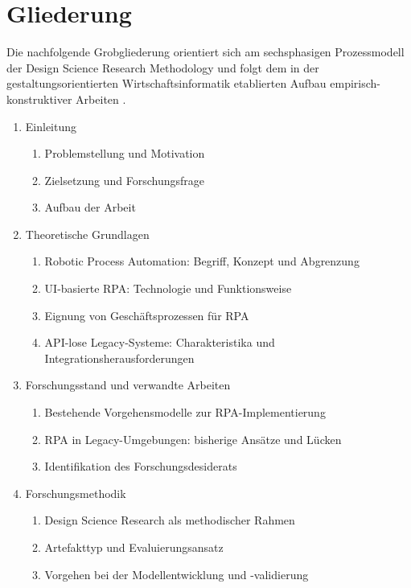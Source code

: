 \newpage
\section{Gliederung}

Die nachfolgende Grobgliederung orientiert sich am sechsphasigen Prozessmodell der Design Science Research Methodology \autocite[Vgl.][S.~45]{Peffers2007} und folgt dem in der gestaltungsorientierten Wirtschaftsinformatik etablierten Aufbau empirisch-konstruktiver Arbeiten \autocite[Vgl.][S.~75]{Hevner2004}.

{\renewcommand{\labelenumii}{\theenumi.\arabic{enumii}}
\begin{enumerate}
  \item Einleitung
    \begin{enumerate}
      \item Problemstellung und Motivation
      \item Zielsetzung und Forschungsfrage
      \item Aufbau der Arbeit
    \end{enumerate}

  \item Theoretische Grundlagen
    \begin{enumerate}
      \item Robotic Process Automation: Begriff, Konzept und Abgrenzung
      \item \acs{UI}-basierte \ac{RPA}: Technologie und Funktionsweise
      \item Eignung von Geschäftsprozessen für \ac{RPA}
      \item \acs{API}-lose Legacy-Systeme: Charakteristika und Integrationsherausforderungen
    \end{enumerate}

  \item Forschungsstand und verwandte Arbeiten
    \begin{enumerate}
      \item Bestehende Vorgehensmodelle zur \acs{RPA}-Implementierung
      \item \ac{RPA} in Legacy-Umgebungen: bisherige Ansätze und Lücken
      \item Identifikation des Forschungsdesiderats
    \end{enumerate}

  \item Forschungsmethodik
    \begin{enumerate}
      \item Design Science Research als methodischer Rahmen
      \item Artefakttyp und Evaluierungsansatz
      \item Vorgehen bei der Modellentwicklung und -validierung
    \end{enumerate}


\end{enumerate}}
